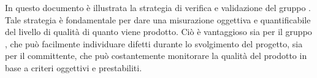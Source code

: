 In questo documento è illustrata la {strategia} di {verifica} e {validazione} del gruppo \gruppo . Tale strategia è fondamentale per dare una misurazione oggettiva e quantificabile del livello di {qualità} di quanto viene prodotto. \newline
Ciò è vantaggioso sia per il gruppo \gruppo , che può facilmente individuare difetti durante lo svolgimento del progetto, sia per il {committente}, che può costantemente monitorare la qualità del prodotto in base a criteri oggettivi e prestabiliti.

